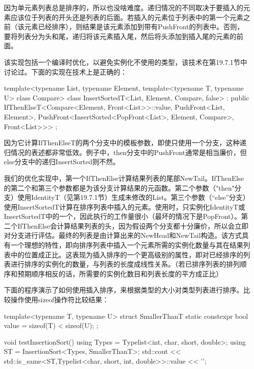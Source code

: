 因为单元素列表总是排序的，所以也没啥难度。递归情况的不同取决于要插入的元素应该位于列表的开头还是列表的后面。若插入的元素位于列表中的第一个元素之前（该元素已经排序），则结果是该元素添加到带有PushFront的列表中。否则，要将列表分为头和尾，递归将该元素插入尾，然后将头添加到插入尾的元素的前面。

该实现包括一个编译时优化，以避免实例化不使用的类型，该技术在第19.7.1节中讨论过。下面的实现在技术上是正确的：

\begin{cpp}
template<typename List, typename Element,
		template<typename T, typename U> class Compare>
class InsertSortedT<List, Element, Compare, false>
: public IfThenElseT<Compare<Element, Front<List>>::value,
					PushFront<List, Element>,
					PushFront<InsertSorted<PopFront<List>,
											Element, Compare>,
							Front<List>>> {};
\end{cpp}

因为它计算IfThenElseT的两个分支中的模板参数，即使只使用一个分支，这种递归情况的表述都非常低效。例子中，then分支中的PushFront通常是相当廉价，但else分支中的递归InsertSorted则不然。

我们的优化实现中，第一个IfThenElse计算结果列表的尾部NewTail。IfThenElse的第二个和第三个参数都是为该分支计算结果的元函数。第二个参数（"then"分支）使用IdentityT（见第19.7.1节）生成未修改的List。第三个参数（“else”分支）使用InsertSortedT计算在排序列表中插入的元素。使用时，只实例化IdentityT或InsertSortedT中的一个，因此执行的工作量很小（最坏的情况下是PopFront）。第二个IfThenElse会计算结果列表的头，因为假设两个分支都十分廉价，所以会立即对分支进行评估。最终的列表是由计算出来的NewHead和NewTail构造。该方式具有一个理想的特性，即向排序列表中插入一个元素所需的实例化数量与其在结果列表中的位置成正比。这表现为插入排序的一个更高级别的属性，即对已经排序的列表进行排序的实例化的数量，与列表的长度成线性关系。（若已排序列表的排列顺序和预期顺序相反的话，所需要的实例化数目和列表长度的平方成正比）

下面的程序演示了如何使用插入排序，来根据类型的大小对类型列表进行排序。比较操作使用sizeof操作符比较结果：

\begin{cpp}
template<typename T, typename U>
struct SmallerThanT {
	static constexpr bool value = sizeof(T) < sizeof(U);
};

void testInsertionSort() {
	using Types = Typelist<int, char, short, double>;
	using ST = InsertionSort<Types, SmallerThanT>;
	std::cout << std::is_same<ST,Typelist<char, short, int, double>>::value
			<< '\n';
}
\end{cpp}

























